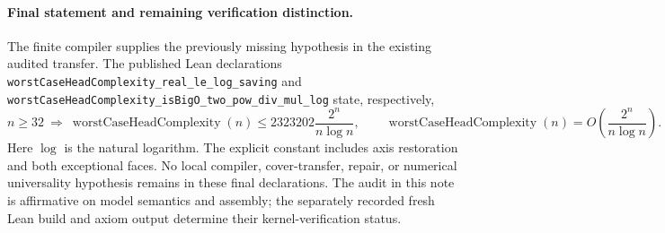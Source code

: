 \documentclass[11pt]{article}
\newcommand{\W}{\operatorname{worstCaseHeadComplexity}}
\begin{document}
\paragraph{Final statement and remaining verification distinction.}
The finite compiler supplies the previously missing hypothesis in
the existing audited transfer.  The published Lean declarations
\texttt{worstCaseHeadComplexity\_real\_le\_log\_saving} and
\texttt{worstCaseHeadComplexity\_isBigO\_two\_pow\_div\_mul\_log}
state, respectively,
\[
 n\geq32\ \Longrightarrow\
 \W(n)\leq2323202\frac{2^n}{n\log n},\qquad
 \W(n)=O\left(\frac{2^n}{n\log n}\right).
\]
Here $\log$ is the natural logarithm.  The explicit constant includes
axis restoration and both exceptional faces.  No local compiler,
cover-transfer, repair, or numerical universality hypothesis remains
in these final declarations.  The audit in this note is affirmative
on model semantics and assembly; the separately recorded fresh Lean
build and axiom output determine their kernel-verification status.
\end{document}
